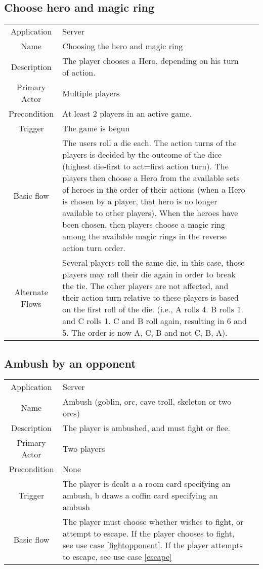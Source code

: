\subsection{Choose hero and magic ring}
\label{choosehero}
\begin{tabular}{|c| p{9cm}|c}
\hline
Application & Server \\
Name & Choosing the hero and magic ring \\
Description & The player chooses a Hero, depending on his turn of action. \\
Primary Actor & Multiple players \\
Precondition & At least 2 players in an active game. \\
Trigger & The game is begun \\ \hline
Basic flow & The users roll a die each. The action turns of the players is decided by the outcome of the dice (highest die-first to act=first action turn). The players then choose a Hero from the available sets of heroes in the order of their actions (when a Hero is chosen by a player, that hero is no longer available to other players). When the heroes have been chosen, then players choose a magic ring among the available magic rings in the reverse action turn order. \\ \hline
Alternate Flows & Several players roll the same die, in this case, those players may roll their die again in order to break the tie. The other players are not affected, and their action turn relative to these players is based on the first roll of the die. (i.e., A rolls 4. B rolls 1. and C rolls 1. C and B roll again, resulting in 6 and 5. The order is now A, C, B and not C, B, A). \\
\hline
\end{tabular}


\subsection{Ambush by an opponent}
\label{ambushopponent}
\begin{tabular}{|c| p{9cm}|c}
\hline
Application & Server \\
Name & Ambush (goblin, orc, cave troll, skeleton or two orcs) \\
Description & The player is ambushed, and must fight or flee. \\
Primary Actor & Two players \\
Precondition & None \\
Trigger & The player is dealt a a room card specifying an ambush, b draws a coffin card specifying an ambush \\ \hline
Basic flow & The player must choose whether wishes to fight, or attempt to escape. If the player chooses to fight, see use case \ref{fightopponent}. If the player attempts to escape, see use case \ref{escape} \\
\hline
\end{tabular}


